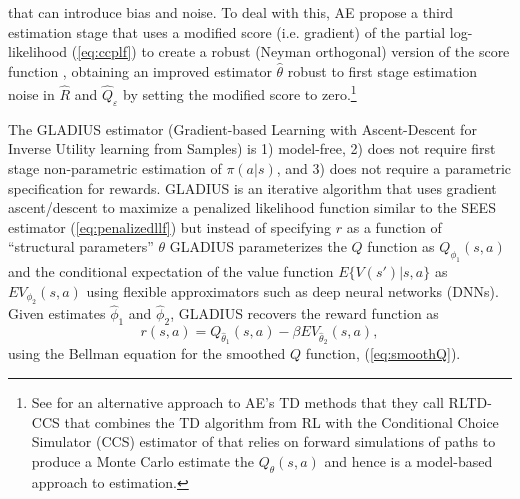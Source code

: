 that can introduce bias and noise. To deal with this, AE propose a third estimation stage that uses  
a modified  score (i.e. gradient) of the  partial log-likelihood (\ref{eq:ccplf}) to create 
a robust (Neyman orthogonal) version of the score function \citep{lrspe:2022},
obtaining an improved estimator $\hat\theta$ robust to first stage estimation
noise in $\hat R$ and $\hat Q_\varepsilon$ by setting the modified score to zero.\footnote{\footnotesize
See \citet{khwaja:2025} for an alternative approach to AE's TD methods that they call RLTD-CCS that combines the TD algorithm 
from RL with the Conditional Choice Simulator (CCS) estimator of \citet{hmss:1994} that relies on forward simulations
of paths to produce a Monte Carlo estimate the $Q_\theta(s,a)$  and hence is a model-based approach to estimation.}

The GLADIUS estimator \citep{kang:2025} (Gradient-based Learning with Ascent-Descent for Inverse Utility learning from Samples)
is 1) model-free, 2) does not require first stage non-parametric estimation of $\pi(a|s)$,
and 3) does not require a parametric specification for rewards. GLADIUS is an iterative 
algorithm that uses gradient ascent/descent to maximize a penalized likelihood function similar to the SEES estimator
(\ref{eq:penalizedllf}) but instead of specifying $r$ as a function of ``structural parameters''
$\theta$ GLADIUS parameterizes the $Q$ function as $Q_{\phi_1}(s,a)$ and the conditional expectation of the value function $E\{V(s')|s,a\}$ as
$EV_{\phi_2}(s,a)$ using flexible approximators such as deep neural networks (DNNs). Given estimates
$\hat\phi_1$ and $\hat\phi_2$, GLADIUS recovers the reward function as 
\begin{equation}
             r(s,a) = Q_{\hat\theta_1}(s,a)-\beta EV_{\hat\theta_2}(s,a),
\end{equation}
using the Bellman equation for the smoothed $Q$ function, (\ref{eq:smoothQ}).

